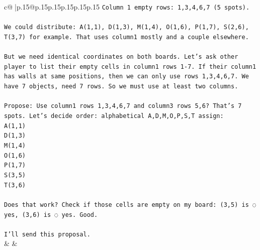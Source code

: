 \documentclass{article}
\begin{document}
{\begin{supertabular}{c@{$\;$}|p{.15\linewidth}@{}p{.15\linewidth}p{.15\linewidth}p{.15\linewidth}p{.15\linewidth}p{.15\linewidth}}
{{{\texttt{Column 1 empty rows: 1,3,4,6,7 (5 spots).} \\
\\ 
\texttt{We could distribute: A(1,1), D(1,3), M(1,4), O(1,6), P(1,7), S(2,6), T(3,7) for example. That uses column1 mostly and a couple elsewhere.} \\
\\ 
\texttt{But we need identical coordinates on both boards. Let's ask other player to list their empty cells in column1 rows 1{-}7. If their column1 has walls at same positions, then we can only use rows 1,3,4,6,7. We have 7 objects, need 7 rows. So we must use at least two columns.} \\
\\ 
\texttt{Propose: Use column1 rows 1,3,4,6,7 and column3 rows 5,6? That's 7 spots. Let's decide order: alphabetical A,D,M,O,P,S,T assign:  } \\
\texttt{A(1,1)  } \\
\texttt{D(1,3)  } \\
\texttt{M(1,4)  } \\
\texttt{O(1,6)  } \\
\texttt{P(1,7)  } \\
\texttt{S(3,5)  } \\
\texttt{T(3,6)} \\
\\ 
\texttt{Does that work? Check if those cells are empty on my board: (3,5) is ◌ yes, (3,6) is ◌ yes. Good.} \\
\\ 
\texttt{I'll send this proposal.} \\
            }
        }
    }
    & & \\ \\


\end{supertabular}}
\end{document}
